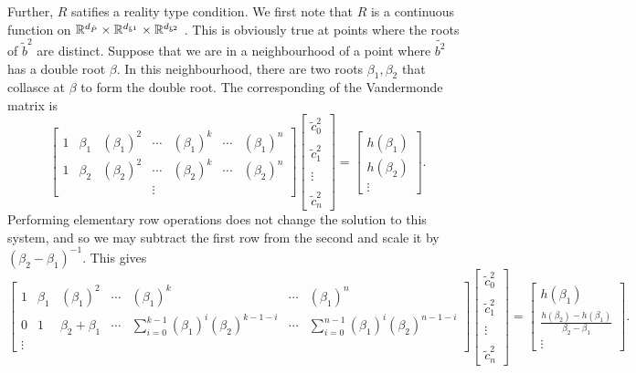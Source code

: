Further, $R$ satifies a reality type condition. We first note that $R$ is a continuous function on $\mathbb{R}^{d_{\tilde{P}}}\times\mathbb{R}^{d_{\tilde{b}^1}}\times\mathbb{R}^{d_{\tilde{b}^2}}$
.
This is obviously true at points where the roots of $\tilde{b}^2$ are distinct. Suppose that we are in a neighbourhood of a point where $\tilde{b^2}$ has a double root $β$. In this neighbourhood, there are two roots $β_1,β_2$ that collasce at $β$ to form the double root. The corresponding of the Vandermonde matrix is
\[
\begin{bmatrix}
1 & β_1 & (β_1)^2 & \cdots & (β_1)^{k} & \cdots & (β_1)^{n} \\
1 & β_2 & (β_2)^2 & \cdots & (β_2)^{k} & \cdots & (β_2)^{n} \\
&&&\vdots&&&
\end{bmatrix}
\begin{bmatrix}
\tilde{c}^2_0 \\~\\ \tilde{c}^2_1 \\~\\ \vdots \\~\\ \tilde{c}^2_n
\end{bmatrix}
=
\begin{bmatrix}
h(β_1) \\
h(β_2) \\
\vdots
\end{bmatrix}.
\]
Performing elementary row operations does not change the solution to this system, and so we may subtract the first row from the second and scale it by $(β_2-β_1)^{-1}$. This gives
\[
\begin{bmatrix}
1 & β_1 & (β_1)^2 & \cdots & (β_1)^{k} & \cdots & (β_1)^{n} \\
0 & 1 & β_2+β_1 & \cdots & \sum_{i=0}^{k-1}(β_1)^i(β_2)^{k-1-i} & \cdots & \sum_{i=0}^{n-1}(β_1)^i(β_2)^{n-1-i} \\
\vdots
\end{bmatrix}
\begin{bmatrix}
\tilde{c}^2_0 \\~\\ \tilde{c}^2_1 \\~\\ \vdots \\~\\ \tilde{c}^2_n
\end{bmatrix}
=
\begin{bmatrix}
h(β_1) \\
\frac{h(β_2) - h(β_1)}{β_2 - β_1} \\
\vdots
\end{bmatrix}.
\]
